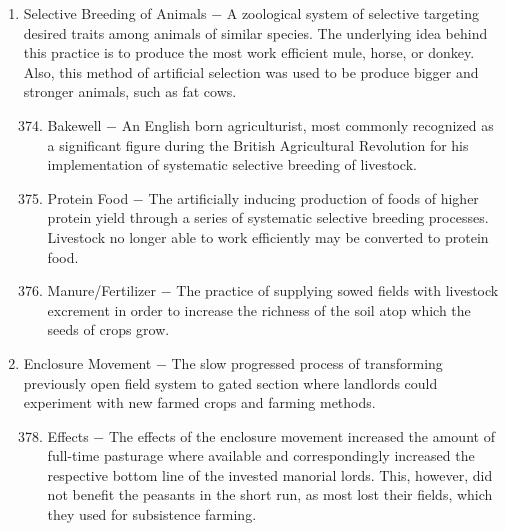 \documentclass[12pt]{article}
\begin{document}
\begin{enumerate}
\begin{enumerate}[label=\arabic{*}.]
\end{enumerate}
\setcounter{enumi}{372}

\item Selective Breeding of Animals $-$ A zoological system of selective targeting desired traits among animals of similar species. The underlying idea behind this practice is to produce the most work efficient mule, horse, or donkey. Also, this method of artificial selection was used to be produce bigger and stronger animals, such as fat cows.

\begin{enumerate}[label=\arabic{*}.]
\setcounter{enumii}{373}

\item Bakewell $-$ An English born agriculturist, most commonly recognized as a significant figure during the British Agricultural Revolution for his implementation of systematic selective breeding of livestock.

\item Protein Food $-$ The artificially inducing production of foods of higher protein yield through a series of systematic selective breeding processes. Livestock no longer able to work efficiently may be converted to protein food.

\item Manure/Fertilizer $-$ The practice of supplying sowed fields with livestock excrement in order to increase the richness of the soil atop which the seeds of crops grow.

\end{enumerate}
\setcounter{enumi}{376}

\item Enclosure Movement $-$ The slow progressed process of transforming previously open field system to gated section where landlords could experiment with new farmed crops and farming methods.

\begin{enumerate}[label=\arabic{*}.]
\setcounter{enumii}{377}

\item Effects $-$ The effects of the enclosure movement increased the amount of full-time pasturage where available and correspondingly increased the respective bottom line of the invested manorial lords. This, however, did not benefit the peasants in the short run, as most lost their fields, which they used for subsistence farming.

\end{enumerate}
\setcounter{enumi}{378}


\end{enumerate}
\end{document}
